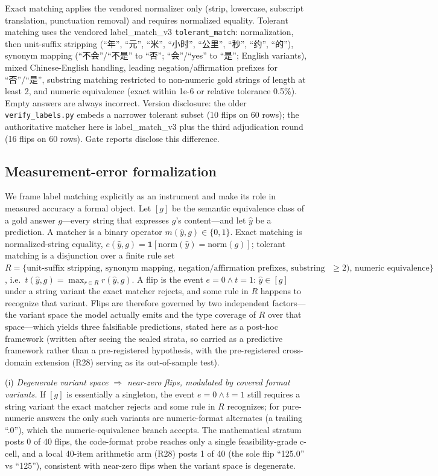 \documentclass[10pt]{article} %
\begin{document}
Exact matching applies the vendored normalizer only (strip, lowercase, subscript translation, punctuation removal) and requires normalized equality. Tolerant matching uses the vendored label\_match\_v3 \texttt{tolerant\_match}: normalization, then unit-suffix stripping (``年'', ``元'', ``米'', ``小时'', ``公里'', ``秒'', ``约'', ``的''), synonym mapping (``不会''/``不是'' to ``否''; ``会''/``yes'' to ``是''; English variants), mixed Chinese-English handling, leading negation/affirmation prefixes for ``否''/``是'', substring matching restricted to non-numeric gold strings of length at least 2, and numeric equivalence (exact within 1e-6 or relative tolerance 0.5\%). Empty answers are always incorrect. Version disclosure: the older \texttt{verify\_labels.py} embeds a narrower tolerant subset (10 flips on 60 rows); the authoritative matcher here is label\_match\_v3 plus the third adjudication round (16 flips on 60 rows). Gate reports disclose this difference.

\subsection{Measurement-error formalization}

We frame label matching explicitly as an instrument and make its role in measured accuracy a formal object. Let $[g]$ be the semantic equivalence class of a gold answer $g$---every string that expresses $g$'s content---and let $\hat y$ be a prediction. A matcher is a binary operator $m(\hat y, g)\in\{0,1\}$. Exact matching is normalized-string equality, $e(\hat y, g)=\mathbf 1[\mathrm{norm}(\hat y)=\mathrm{norm}(g)]$; tolerant matching is a disjunction over a finite rule set $R=\{\text{unit-suffix stripping, synonym mapping, negation/affirmation prefixes, substring matching (non-numeric gold, length }\ge 2\text{), numeric equivalence}\}$, i.e.\ $t(\hat y,g)=\max_{r\in R} r(\hat y,g)$. A flip is the event $e=0\wedge t=1$: $\hat y\in[g]$ under a string variant the exact matcher rejects, and some rule in $R$ happens to recognize that variant. Flips are therefore governed by two independent factors---the variant space the model actually emits and the type coverage of $R$ over that space---which yields three falsifiable predictions, stated here as a post-hoc framework (written after seeing the sealed strata, so carried as a predictive framework rather than a pre-registered hypothesis, with the pre-registered cross-domain extension (R28) serving as its out-of-sample test).

(i) \emph{Degenerate variant space $\Rightarrow$ near-zero flips, modulated by covered format variants.} If $[g]$ is essentially a singleton, the event $e=0\wedge t=1$ still requires a string variant the exact matcher rejects and some rule in $R$ recognizes; for pure-numeric answers the only such variants are numeric-format alternates (a trailing ``.0''), which the numeric-equivalence branch accepts. The mathematical stratum posts 0 of 40 flips, the code-format probe reaches only a single feasibility-grade c-cell, and a local 40-item arithmetic arm (R28) posts 1 of 40 (the sole flip ``125.0'' vs ``125''), consistent with near-zero flips when the variant space is degenerate.
\end{document}
